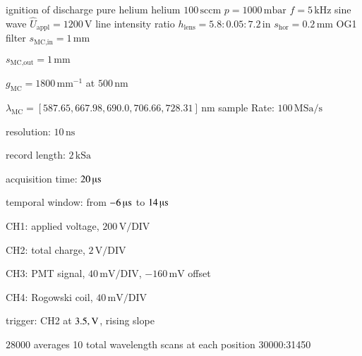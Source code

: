 \begin{Liste}
	\itemwas ignition of discharge
	 pure helium
	 helium $100\,\text{sccm}$
	 $p=1000\,\text{mbar}$
	 $f=5\,\text{kHz}$
	 sine wave
	 $\hat U_\text{appl}=1200\,\text{V}$
	\leer
	\itemwas line intensity ratio
	 $h_\text{lens}=5.8:0.05:7.2\,\text{in}$
	 $s_\text{hor}=0.2\,\text{mm}$
	 OG1 filter
 	 $s_\text{MC,in}=1\,\text{mm}$
	\item $s_\text{MC,out}=1\,\text{mm}$
	\item $g_\text{MC}=1800\,\text{mm}^{-1}$ at $500\,\text{nm}$
	\item $\lambda_\text{MC}=[587.65,667.98,690.0,706.66,728.31]\,\text{nm}$
	\leer
	 sample Rate: $100\,\text{MSa}/\text{s}$
	\item resolution: $10\,\text{ns}$
	\item record length: $2\,\text{kSa}$
	\item acquisition time: $20\,\text{\textmu s}$
	\item temporal window: from $-6\,\text{\textmu s}$ to $14\,\text{\textmu s}$
	\item CH1: applied voltage, $200\,\text{V}/\text{DIV}$
	\item CH2: total charge, $2\,\text{V}/\text{DIV}$
	\item CH3: PMT signal, $40\,\text{mV}/\text{DIV}$, $-160\,\text{mV}$ offset
	\item CH4: Rogowski coil, $40\,\text{mV}/\text{DIV}$
	\item trigger: CH2 at $\-3.5,\text{V}$, rising slope
	\item $28000$ averages
	 10 total wavelength scans at each position
	\leer
	 30000:31450
\end{Liste}

